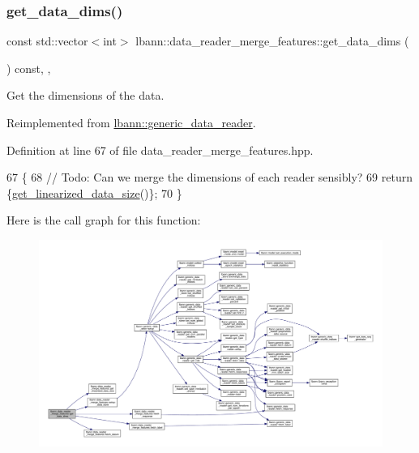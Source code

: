 \subsubsection{\texorpdfstring{get\+\_\+data\+\_\+dims()}{get\_data\_dims()}}
{\footnotesize\ttfamily const std\+::vector$<$int$>$ lbann\+::data\+\_\+reader\+\_\+merge\+\_\+features\+::get\+\_\+data\+\_\+dims (\begin{DoxyParamCaption}{ }\end{DoxyParamCaption}) const\hspace{0.3cm}{\ttfamily [inline]}, {\ttfamily [override]}, {\ttfamily [virtual]}}



Get the dimensions of the data. 



Reimplemented from \hyperlink{classlbann_1_1generic__data__reader_ae06ff27459ac4a5d8ac14655d4b31318}{lbann\+::generic\+\_\+data\+\_\+reader}.



Definition at line 67 of file data\+\_\+reader\+\_\+merge\+\_\+features.\+hpp.


\begin{DoxyCode}
67                                                       \{
68     \textcolor{comment}{// Todo: Can we merge the dimensions of each reader sensibly?}
69     \textcolor{keywordflow}{return} \{\hyperlink{classlbann_1_1data__reader__merge__features_a9cf5a37a562c5bdd3861da9ec2e54638}{get\_linearized\_data\_size}()\};
70   \}
\end{DoxyCode}
Here is the call graph for this function\+:\nopagebreak
\begin{figure}[H]
\begin{center}
\leavevmode
\includegraphics[width=350pt]{classlbann_1_1data__reader__merge__features_aa0cd0caf93ad18f496bf80d7cafa5527_cgraph}
\end{center}
\end{figure}
\mbox{\label{classlbann_1_1data__reader__merge__features_a9cf5a37a562c5bdd3861da9ec2e54638}} 
